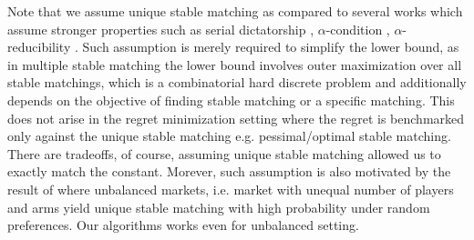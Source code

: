 \documentclass{article}
\newcommand{\E}{\mathbb{E}}
\newtheorem{theorem}{Theorem}
\begin{document}
Note that we assume unique stable matching as compared to several works which assume stronger properties such as serial dictatorship \cite{sankararaman2021dominate}, $\alpha$-condition \cite{pmlr-v139-basu21a}, $\alpha$-reducibility \cite{maheshwari2022decentralized}. Such assumption is merely required to simplify the lower bound, as in multiple stable matching the lower bound involves outer maximization over all stable matchings, which is a combinatorial hard discrete problem and additionally depends on the objective of finding stable matching or a specific matching. This does not arise in the regret minimization setting where the regret is benchmarked only against the unique stable matching e.g. pessimal/optimal stable matching. There are tradeoffs, of course, assuming unique stable matching allowed us to exactly match the constant. Morever, such assumption is also motivated by the result of \cite{ashlagi2017unbalanced} where unbalanced markets, i.e. market with unequal number of players and arms yield unique stable matching with high probability under random preferences. Our algorithms works even for unbalanced setting. 







\end{document}
